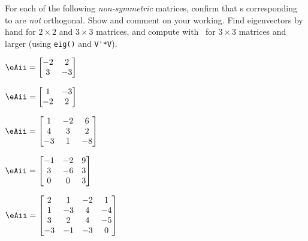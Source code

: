\begin{exercise} \label{ex:smnoevs} 
For each of the following \emph{non-symmetric} matrices, confirm that s corresponding to  are \emph{not} orthogonal.  Show and comment on your working.
Find eigenvectors by hand for \(2\times 2\) and \(3\times 3\) matrices, and compute with \script\ for \(3\times 3\) matrices and larger (using \verb|eig()| and \verb|V'*V|).
\begin{parts}
\item \(\eAii=\begin{bmatrix} -2&2
\\3&-3 \end{bmatrix}\)

\item \(\eAii=\begin{bmatrix}1&-3
\\-2&2 \end{bmatrix}\)

\item \(\eAii=\begin{bmatrix} 1&-2&6
\\4&3&2
\\-3&1&-8 \end{bmatrix}\)

\item \(\eAii=\begin{bmatrix} -1&-2&9
\\3&-6&3
\\0&0&3 \end{bmatrix}\)


\item \(\eAii=\begin{bmatrix} 2&1&-2&1
\\1&-3&4&-4
\\3&2&4&-5
\\-3&-1&-3&0 \end{bmatrix}\)


\end{parts}
\end{exercise}

